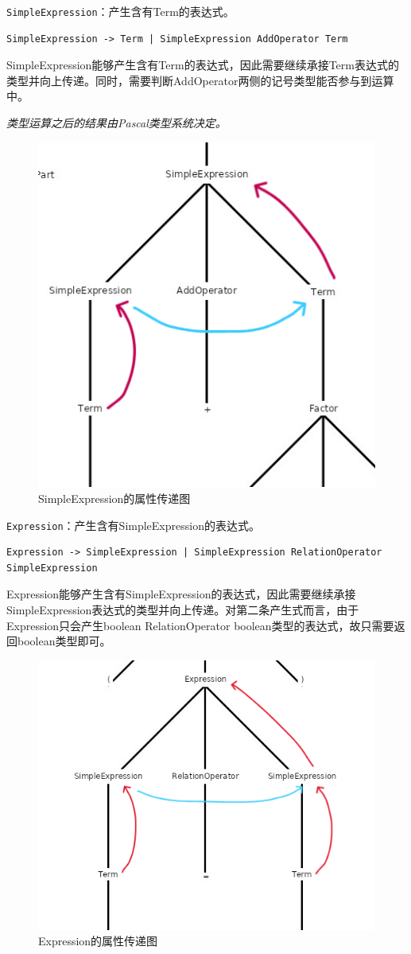 \documentclass[../main.tex]{subfiles}
\begin{document}
\texttt{SimpleExpression}：产生含有Term的表达式。

\begin{lstlisting}[style=grammar]
SimpleExpression -> Term | SimpleExpression AddOperator Term
\end{lstlisting}

SimpleExpression能够产生含有Term的表达式，因此需要继续承接Term表达式的类型并向上传递。同时，需要判断AddOperator两侧的记号类型能否参与到运算中。

\textit{类型运算之后的结果由Pascal类型系统决定。}

\begin{figure}[h]
\centering
\includegraphics[width=0.5\linewidth ]{assets/类型检查/SimpleExpression.png}
\caption{SimpleExpression的属性传递图}
\label{fig:SimpleExpression}
\end{figure}

\texttt{Expression}：产生含有SimpleExpression的表达式。

\begin{lstlisting}[style=grammar]
Expression -> SimpleExpression | SimpleExpression RelationOperator SimpleExpression
\end{lstlisting}

Expression能够产生含有SimpleExpression的表达式，因此需要继续承接SimpleExpression表达式的类型并向上传递。对第二条产生式而言，由于Expression只会产生boolean RelationOperator boolean类型的表达式，故只需要返回boolean类型即可。

\begin{figure}[h]
\centering
\includegraphics[width=0.5\linewidth ]{assets/类型检查/Expression.png}
\caption{Expression的属性传递图}
\label{fig:Expression}
\end{figure}
\end{document}

